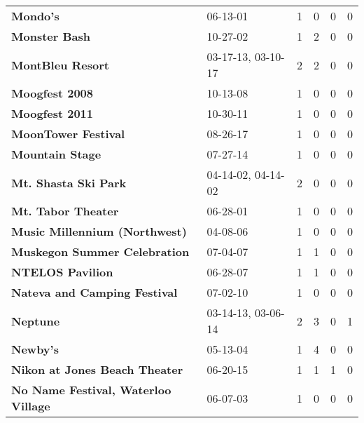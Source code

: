 \begin{supertabular}{p{0.4\textwidth}p{0.3\textwidth}p{0.05\textwidth}p{0.05\textwidth}p{0.05\textwidth}p{0.05\textwidth}}
                                                     \textbf{Mondo's} &            06-13-01 &  1 &  0 &  0 &  0 \\
                                                \textbf{Monster Bash} &            10-27-02 &  1 &  2 &  0 &  0 \\
                                             \textbf{MontBleu Resort} &  03-17-13, 03-10-17 &  2 &  2 &  0 &  0 \\
                                               \textbf{Moogfest 2008} &            10-13-08 &  1 &  0 &  0 &  0 \\
                                               \textbf{Moogfest 2011} &            10-30-11 &  1 &  0 &  0 &  0 \\
                                          \textbf{MoonTower Festival} &            08-26-17 &  1 &  0 &  0 &  0 \\
                                              \textbf{Mountain Stage} &            07-27-14 &  1 &  0 &  0 &  0 \\
                                         \textbf{Mt. Shasta Ski Park} &  04-14-02, 04-14-02 &  2 &  0 &  0 &  0 \\
                                           \textbf{Mt. Tabor Theater} &            06-28-01 &  1 &  0 &  0 &  0 \\
                                \textbf{Music Millennium (Northwest)} &            04-08-06 &  1 &  0 &  0 &  0 \\
                                 \textbf{Muskegon Summer Celebration} &            07-04-07 &  1 &  1 &  0 &  0 \\
                                             \textbf{NTELOS Pavilion} &            06-28-07 &  1 &  1 &  0 &  0 \\
                                 \textbf{Nateva and Camping Festival} &            07-02-10 &  1 &  0 &  0 &  0 \\
                                                     \textbf{Neptune} &  03-14-13, 03-06-14 &  2 &  3 &  0 &  1 \\
                                                     \textbf{Newby's} &            05-13-04 &  1 &  4 &  0 &  0 \\
                                \textbf{Nikon at Jones Beach Theater} &            06-20-15 &  1 &  1 &  1 &  0 \\
                          \textbf{No Name Festival, Waterloo Village} &            06-07-03 &  1 &  0 &  0 &  0 \\

\end{supertabular}
